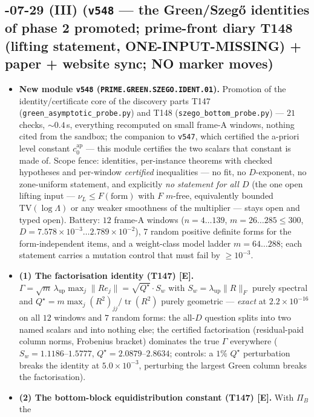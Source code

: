 \documentclass[11pt]{article}
\providecommand{\mE}{\textbf{[E]}}\providecommand{\mC}{\textbf{[C]}}
\begin{document}
\subsection*{-07-29 (III) (\texttt{v548} --- the Green/Szeg\H{o} identities of phase 2 promoted; prime-front diary T148 (lifting statement, ONE-INPUT-MISSING) + paper + website sync; NO marker moves)}
\begin{itemize}[leftmargin=1.5em]
\item \textbf{New module \texttt{v548} (\texttt{PRIME.GREEN.SZEGO.IDENT.01}).} Promotion of the
identity/certificate core of the discovery parts T147 (\texttt{green\_asymptotic\_probe.py}) and
T148 (\texttt{szego\_bottom\_probe.py}) --- $21$ checks, ${\sim}0.4$\,s, everything recomputed on
small frame-A windows, nothing cited from the sandbox; the companion to \texttt{v547}, which
certified the a-priori level constant $c_0^{\mathrm{ap}}$ --- this module certifies the two
scalars that constant is made of. Scope fence: identities, per-instance theorems with checked
hypotheses and per-window \emph{certified} inequalities --- no fit, no $D$-exponent, no
zone-uniform statement, and explicitly \emph{no statement for all $D$} (the one open lifting
input --- $\nu_L\le F(\text{form})$ with $F$ $m$-free, equivalently bounded
$\mathrm{TV}(\log\Lambda)$ or any weaker smoothness of the multiplier --- stays open and typed
open). Battery: $12$ frame-A windows ($n=4\ldots139$, $m=26\ldots285\le300$,
$D=7.578\times10^{-3}\ldots2.789\times10^{-2}$), $7$ random positive definite forms for the
form-independent items, and a weight-class model ladder $m=64\ldots288$; each statement carries a
mutation control that must fail by $\ge10^{-3}$.
\item \textbf{(1) The factorisation identity (T147) \mE.}
$\Gamma=\sqrt m\,\lambda_{\mathrm{up}}\max_j\|Re_j\|=\sqrt{Q^\star}\cdot S_w$ with
$S_w=\lambda_{\mathrm{up}}\|R\|_F$ purely spectral and
$Q^\star=m\max_j(R^2)_{jj}/\operatorname{tr}(R^2)$ purely geometric --- \emph{exact} at
$2.2\times10^{-16}$ on all $12$ windows and $7$ random forms: the all-$D$ question splits into
two named scalars and into nothing else; the certified factorisation (residual-paid column norms,
Frobenius bracket) dominates the true $\Gamma$ everywhere ($S_w=1.1186$--$1.5777$,
$Q^\star=2.0879$--$2.8634$; controls: a $1\%$ $Q^\star$ perturbation breaks the identity at
$5.0\times10^{-3}$, perturbing the largest Green column breaks the factorisation).
\item \textbf{(2) The bottom-block equidistribution constant (T147) \mE.} With $\Pi_B$ the

\end{itemize}
\end{document}
